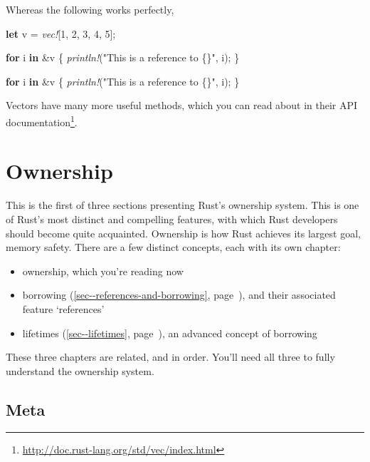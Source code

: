\documentclass[a4paper,]{book}
\renewcommand*{\hypertarget}[3][\ar]{%
  \def\ar{#2}%
  \label{#1}%
  #3}
\renewcommand*{\hyperlink}[2]{%
 #2 (\autoref{#1}, page~\pageref{#1})}
\newenvironment{Shaded}{\begin{snugshade}}{\end{snugshade}}
\newcommand{\KeywordTok}[1]{\textcolor[rgb]{0.13,0.29,0.53}{\textbf{{#1}}}}
\newcommand{\DecValTok}[1]{\textcolor[rgb]{0.00,0.00,0.81}{{#1}}}
\newcommand{\StringTok}[1]{\textcolor[rgb]{0.31,0.60,0.02}{{#1}}}
\newcommand{\PreprocessorTok}[1]{\textcolor[rgb]{0.56,0.35,0.01}{\textit{{#1}}}}
\newcommand{\NormalTok}[1]{{#1}}
\renewcommand{\href}[2]{#2\footnote{\url{#1}}}
\providecommand{\tightlist}{%
  \setlength{\itemsep}{0pt}\setlength{\parskip}{0pt}}
\begin{document}
Whereas the following works perfectly,

\begin{Shaded}
\begin{Highlighting}[]
\KeywordTok{let} \NormalTok{v = }\PreprocessorTok{vec!}\NormalTok{[}\DecValTok{1}\NormalTok{, }\DecValTok{2}\NormalTok{, }\DecValTok{3}\NormalTok{, }\DecValTok{4}\NormalTok{, }\DecValTok{5}\NormalTok{];}

\KeywordTok{for} \NormalTok{i }\KeywordTok{in} \NormalTok{&v \{}
    \PreprocessorTok{println!}\NormalTok{(}\StringTok{"This is a reference to \{\}"}\NormalTok{, i);}
\NormalTok{\}}

\KeywordTok{for} \NormalTok{i }\KeywordTok{in} \NormalTok{&v \{}
    \PreprocessorTok{println!}\NormalTok{(}\StringTok{"This is a reference to \{\}"}\NormalTok{, i);}
\NormalTok{\}}
\end{Highlighting}
\end{Shaded}

Vectors have many more useful methods, which you can read about in
\href{http://doc.rust-lang.org/std/vec/index.html}{their API
documentation}.

\hypertarget{sec--ownership}{\section{Ownership}\label{sec--ownership}}

This is the first of three sections presenting Rust's ownership system.
This is one of Rust's most distinct and compelling features, with which
Rust developers should become quite acquainted. Ownership is how Rust
achieves its largest goal, memory safety. There are a few distinct
concepts, each with its own chapter:

\begin{itemize}
\tightlist
\item
  ownership, which you're reading now
\item
  \protect\hyperlink{sec--references-and-borrowing}{borrowing}, and
  their associated feature `references'
\item
  \protect\hyperlink{sec--lifetimes}{lifetimes}, an advanced concept of
  borrowing
\end{itemize}

These three chapters are related, and in order. You'll need all three to
fully understand the ownership system.

\subsection{Meta}\label{meta}
\end{document}
